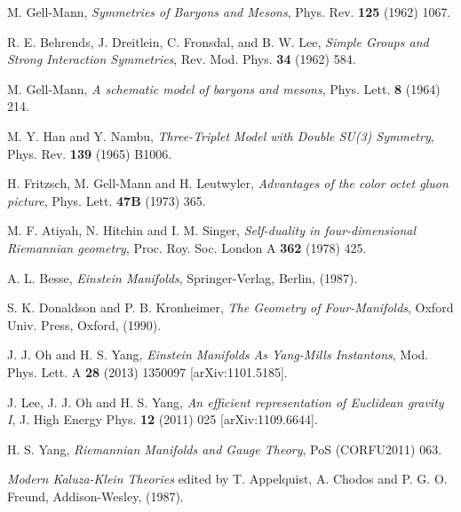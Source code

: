 \documentclass[12pt,epsf]{article}
\begin{document}
\newpage


\begin{thebibliography}{55}


 M. Gell-Mann, {\it Symmetries of Baryons and Mesons}, Phys. Rev. {\bf 125} (1962) 1067.



 R. E. Behrends, J. Dreitlein, C. Fronsdal, and B. W. Lee, {\it Simple Groups and Strong Interaction Symmetries},
Rev. Mod. Phys. {\bf 34} (1962) 584.



 M. Gell-Mann, {\it A schematic model of baryons and mesons}, Phys. Lett. {\bf 8} (1964) 214.




 M. Y. Han and Y. Nambu, {\it Three-Triplet Model with Double SU(3) Symmetry}, Phys. Rev. {\bf 139} (1965) B1006.



 H. Fritzsch, M. Gell-Mann and H. Leutwyler, {\it Advantages of the color octet gluon picture},
Phys. Lett. {\bf 47B} (1973) 365.




 M. F. Atiyah, N. Hitchin and I. M. Singer,
{\it Self-duality in four-dimensional Riemannian geometry}, Proc. Roy. Soc. London A {\bf 362} (1978) 425.




 A. L. Besse, {\it Einstein Manifolds}, Springer-Verlag, Berlin, (1987).



 S. K. Donaldson and P. B. Kronheimer,
{\it The Geometry of Four-Manifolds}, Oxford Univ. Press, Oxford, (1990).



 J. J. Oh and H. S. Yang, {\it Einstein Manifolds As Yang-Mills Instantons},
Mod. Phys. Lett. A {\bf 28} (2013) 1350097 [arXiv:1101.5185].



 J. Lee, J. J. Oh and H. S. Yang, {\it An efficient representation of Euclidean gravity I},
J. High Energy Phys. {\bf 12} (2011) 025 [arXiv:1109.6644].



 H. S. Yang, {\it Riemannian Manifolds and Gauge Theory},
PoS (CORFU2011) 063.



 {\it Modern Kaluza-Klein Theories} edited by T. Appelquist, A. Chodos and P. G. O. Freund,
Addison-Wesley, (1987).





\end{thebibliography}
\end{document}
